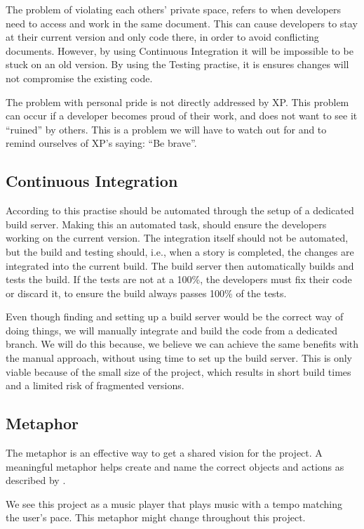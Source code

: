 The problem of violating each others' private space, refers to when developers need to access and work in the same document. This can cause developers to stay at their current version and only code there, in order to avoid conflicting documents.
However, by using Continuous Integration it will be impossible to be stuck on an old version.
By using the Testing practise, it is ensures changes will not compromise the existing code.

The problem with personal pride is not directly addressed by XP.
This problem can occur if a developer becomes proud of their work, and does not want to see it ``ruined'' by others.
This is a problem we will have to watch out for and to remind ourselves of XP's saying: ``Be brave''.
 

\subsection{Continuous Integration}
According to \citet[p. 57]{xp:explored} this practise should be automated through the setup of a dedicated build server.
Making this an automated task, should ensure the developers working on the current version.
The integration itself should not be automated, but the build and testing should, i.e., when a story is completed, the changes are integrated into the current build.
The build server then automatically builds and tests the build.
If the tests are not at a 100\%, the developers must fix their code or discard it, to ensure the build always passes 100\% of the tests.

Even though finding and setting up a build server would be the correct way of doing things, we will manually integrate and build the code from a dedicated branch.
We will do this because, we believe we can achieve the same benefits with the manual approach, without using time to set up the build server.
This is only viable because of the small size of the project, which results in short build times and a limited risk of fragmented versions.

\subsection{Metaphor}
The metaphor is an effective way to get a shared vision for the project.
A meaningful metaphor helps create and name the correct objects and actions as described by \citet[p. 87]{xp:explored}.

We see this project as a music player that plays music with a tempo matching the user's pace.
This metaphor might change throughout this project.

